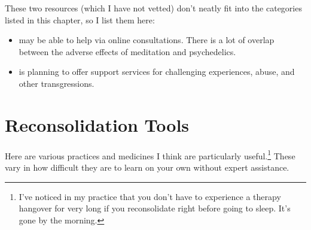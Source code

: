 \documentclass[11pt,oneside]{book}
\begin{document}
These two resources (which I have not vetted) don't neatly fit into the categories listed in this chapter, so I list them here:
\begin{itemize}
    \item \textcite{cheetahHouse} may be able to help via online consultations. There is a lot of overlap between the adverse effects of meditation and psychedelics.
    \item \textcite{psyaware} is planning to offer support services for challenging experiences, abuse, and other transgressions.
\end{itemize}

\section{Reconsolidation Tools}
\label{sec:moreReconsolidation}
Here are various practices and medicines I think are particularly useful.\footnote{I've noticed in my practice that you don't have to experience a therapy hangover for very long if you reconsolidate right before going to sleep. It's gone by the morning.} These vary in how difficult they are to learn on your own without expert assistance.
\end{document}

